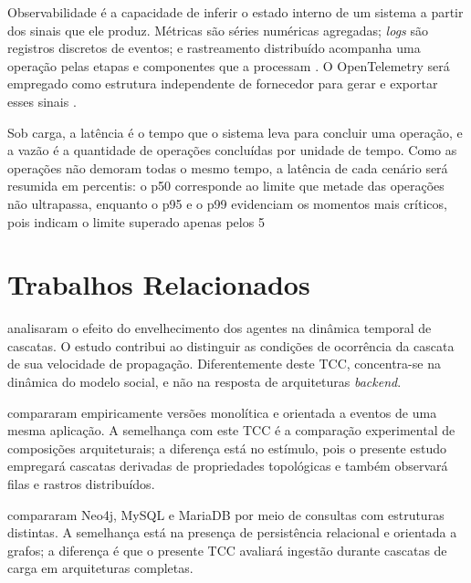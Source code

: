 Observabilidade é a capacidade de inferir o estado interno de um sistema a partir dos sinais que ele produz. Métricas são séries numéricas agregadas; \textit{logs} são registros discretos de eventos; e rastreamento distribuído acompanha uma operação pelas etapas e componentes que a processam \cite{tzanettis2022}. O OpenTelemetry será empregado como estrutura independente de fornecedor para gerar e exportar esses sinais \cite{opentelemetry2026}.

Sob carga, a latência é o tempo que o sistema leva para concluir uma operação, e a vazão é a quantidade de operações concluídas por unidade de tempo. Como as operações não demoram todas o mesmo tempo, a latência de cada cenário será resumida em percentis: o p50 corresponde ao limite que metade das operações não ultrapassa, enquanto o p95 e o p99 evidenciam os momentos mais críticos, pois indicam o limite superado apenas pelos 5%

\estrutura\section{\esp Trabalhos Relacionados}

 analisaram o efeito do envelhecimento dos agentes na dinâmica temporal de cascatas. O estudo contribui ao distinguir as condições de ocorrência da cascata de sua velocidade de propagação. Diferentemente deste TCC, concentra-se na dinâmica do modelo social, e não na resposta de arquiteturas \textit{backend}.

 compararam empiricamente versões monolítica e orientada a eventos de uma mesma aplicação. A semelhança com este TCC é a comparação experimental de composições arquiteturais; a diferença está no estímulo, pois o presente estudo empregará cascatas derivadas de propriedades topológicas e também observará filas e rastros distribuídos.

 compararam Neo4j, MySQL e MariaDB por meio de consultas com estruturas distintas. A semelhança está na presença de persistência relacional e orientada a grafos; a diferença é que o presente TCC avaliará ingestão durante cascatas de carga em arquiteturas completas.

